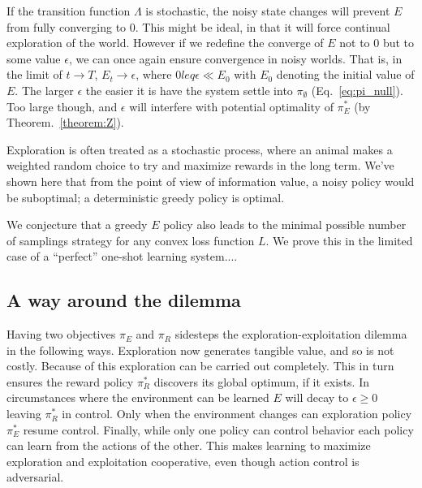 \documentclass[9pt,twocolumn,twoside]{pnas-new}
\begin{document}
If the transition function $\Lambda$ is stochastic, the noisy state changes will prevent $E$ from fully converging to 0. This might be ideal, in that it will force continual exploration of the world. However if we redefine the converge of $E$ not to 0 but to some value $\epsilon$, we can once again ensure convergence in noisy worlds. That is, in the limit of $t \rightarrow T$, $E_t \rightarrow \epsilon$, where $0 leq \epsilon \ll E_0$ with $E_0$ denoting the initial value of $E$. The larger $\epsilon$ the easier it is have the system settle into $\pi_{\emptyset}$ (Eq.~\ref{eq:pi_null}). Too large though, and $\epsilon$ will interfere with potential optimality of $\pi^*_E$ (by Theorem.~\ref{theorem:Z}). 

Exploration is often treated as a stochastic process, where an animal makes a weighted random choice to try and maximize rewards in the long term. We've shown here that from the point of view of information value, a noisy policy would be suboptimal; a deterministic greedy policy is optimal.

We conjecture that a greedy $E$ policy also leads to the minimal possible number of samplings strategy for any convex loss function $L$. We prove this in the limited case of a ``perfect'' one-shot learning system....


\subsection*{A way around the dilemma}
Having two objectives $\pi_E$ and $\pi_R$ sidesteps the exploration-exploitation dilemma in the following ways. Exploration now generates tangible value, and so is not costly. Because of this exploration can be carried out completely. This in turn ensures the reward policy $\pi^*_R$ discovers its global optimum, if it exists. In circumstances where the environment can be learned $E$ will decay to $\epsilon \geq 0$ leaving $\pi^*_R$ in control. Only when the environment changes can exploration policy $\pi^*_E$ resume control. Finally, while only one policy can control behavior each policy can learn from the actions of the other. This makes learning to maximize exploration and exploitation cooperative, even though action control is adversarial. 
\end{document}
